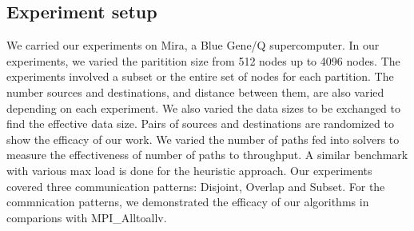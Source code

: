 \subsection{Experiment setup}

We carried our experiments on Mira, a Blue Gene/Q supercomputer. In our experiments, we varied the paritition size from 512 nodes up to 4096 nodes. The experiments involved a subset or the entire set of nodes for each partition. The number sources and destinations, and distance between them, are also varied depending on each experiment. We also varied the data sizes to be exchanged to find the effective data size. Pairs of sources and destinations are randomized to show the efficacy of our work. We varied the number of paths fed into solvers to measure the effectiveness of number of paths to throughput. A similar benchmark with various max load is done for the heuristic approach. Our experiments covered three communication patterns: Disjoint, Overlap and Subset. For the commnication patterns, we demonstrated the efficacy of our algorithms in comparions with MPI\_Alltoallv.

